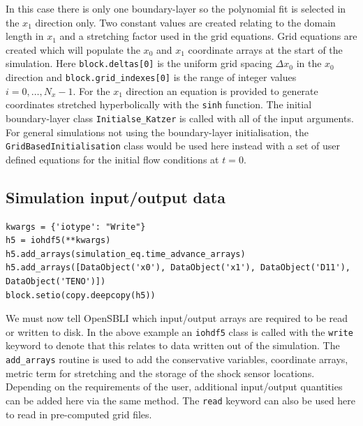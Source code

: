 \documentclass[11pt]{article}
\begin{document}
In this case there is only one boundary-layer so the polynomial fit is selected in the $x_1$ direction only. Two constant values are created relating to the domain length in $x_1$ and a stretching factor used in the grid equations. Grid equations are created which will populate the $x_0$ and $x_1$ coordinate arrays at the start of the simulation. Here \verb|block.deltas[0]| is the uniform grid spacing $\Delta x_0$ in the $x_0$ direction and \verb|block.grid_indexes[0]| is the range of integer values $i=0,\dots , N_{x}-1$. For the $x_1$ direction an equation is provided to generate coordinates stretched hyperbolically with the \verb|sinh| function. The initial boundary-layer class \verb|Initialse_Katzer| is called with all of the input arguments. For general simulations not using the boundary-layer initialisation, the \verb|GridBasedInitialisation| class would be used here instead with a set of user defined equations for the initial flow conditions at $t=0$.


\subsection{Simulation input/output data}
\begin{lstlisting}
kwargs = {'iotype': "Write"}
h5 = iohdf5(**kwargs)
h5.add_arrays(simulation_eq.time_advance_arrays)
h5.add_arrays([DataObject('x0'), DataObject('x1'), DataObject('D11'), DataObject('TENO')])
block.setio(copy.deepcopy(h5))
\end{lstlisting}
We must now tell OpenSBLI which input/output arrays are required to be read or written to disk. In the above example an \verb|iohdf5| class is called with the \verb|write| keyword to denote that this relates to data written out of the simulation. The \verb|add_arrays| routine is used to add the conservative variables, coordinate arrays, metric term for stretching and the storage of the shock sensor locations. Depending on the requirements of the user, additional input/output quantities can be added here via the same method. The \verb|read| keyword can also be used here to read in pre-computed grid files. 
\end{document}
